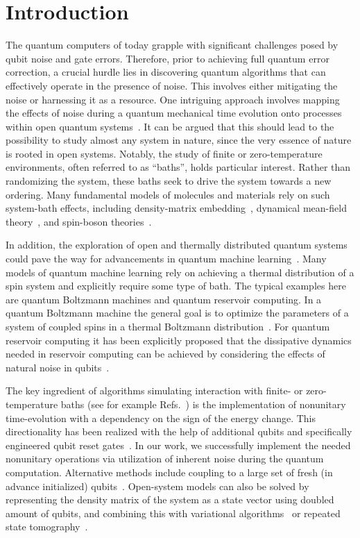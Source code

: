 \documentclass[twocolumn,amsmath,amssymb,pra]{revtex4-2}
\begin{document}
\section{Introduction}
\label{sec:introduction}


The quantum computers of today grapple with significant challenges posed by qubit noise and gate errors.
Therefore, prior to achieving full quantum error correction, a crucial hurdle lies in discovering quantum algorithms that can effectively operate in the presence of noise.
This involves either mitigating the noise or harnessing it as a resource.
One intriguing approach involves mapping the effects of noise during a quantum mechanical time evolution onto processes within  open quantum systems~\cite{Lloyd1996, Tseng2010, Fratus2022}. 
It can be argued that this should lead to the possibility to study almost any system in nature, since the very essence of nature is rooted in open systems.
Notably, the study of finite or zero-temperature environments, often referred to as ``baths'', holds particular interest.
Rather than randomizing the system, these baths seek to drive the system towards a new ordering.
Many fundamental models of molecules and materials rely on such system-bath effects,
including density-matrix embedding~\cite{Wouters2016, Sun_2020}, dynamical mean-field theory~\cite{Rozenberg1996}, and spin-boson theories~\cite{Spin_Boson_Rev, Ishizaki2012, Huelga_2013}.

In addition, the exploration of open and thermally distributed quantum systems could pave the way for advancements in quantum machine learning~\cite{Olivera2023}.
Many models of quantum machine learning rely on achieving a thermal distribution of a spin system and explicitly require some type of bath.
The typical examples here are quantum Boltzmann machines and quantum reservoir computing.
In a quantum Boltzmann machine the general goal is to optimize the parameters of a system of coupled spins in a thermal Boltzmann distribution~\cite{Moro2023}.
For quantum reservoir computing it has been explicitly proposed that the dissipative dynamics needed in reservoir computing can be achieved by considering the effects of natural noise in qubits~\cite{Suzuki2022}.

The key ingredient of algorithms simulating interaction with finite- or zero-temperature baths
(see for example Refs.~\cite{Barreiro2011, Wang2011, Raghunandan_2020, Leppakangas2023, Mi2023, Matthies2024, Puente2024, Marti2024, Lin2024, Lloyd2024})
is the implementation of nonunitary time-evolution with a dependency on the sign of the energy change.
This directionality has been realized with the help of additional qubits and specifically engineered qubit reset gates~\cite{Barreiro2011, Han2021, Rost2021, Mi2023}. 
In our work, we successfully implement the needed nonunitary operations via utilization of inherent noise during the quantum computation.
Alternative methods include coupling to a large set of fresh (in advance initialized) qubits~\cite{Cattaneo2023}. 
Open-system models can also be solved by representing the density matrix of the system
as a state vector using doubled amount of qubits, 
and combining this with variational algorithms~\cite{Yoshioka2020} or repeated state tomography~\cite{Kamakari2022}. 
\end{document}
